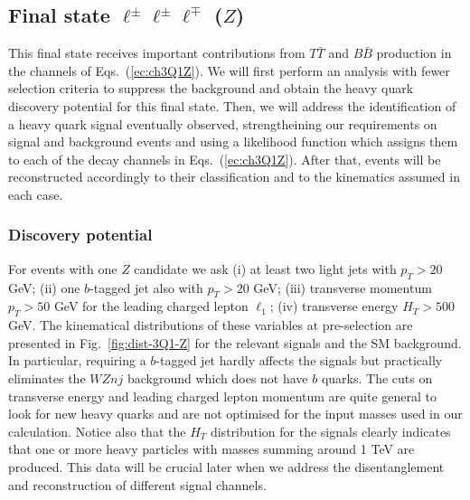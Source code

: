 \documentclass[12pt,a4paper]{article}
\newcommand{\TT}{T \bar T}
\newcommand{\BB}{B \bar B}
\begin{document}
\subsection{Final state $\ell^\pm \ell^\pm \ell^\mp$ ($Z$)}

This final state receives important contributions from $\TT$ and $\BB$ production in the channels of Eqs.~(\ref{ec:ch3Q1Z}). We will first perform an analysis with fewer selection criteria to suppress the background and obtain the heavy quark discovery potential for this final state. Then, we will address the identification of a heavy quark signal eventually observed, strengtheining our requirements on signal and background events and using a likelihood function which assigns them to each of the decay channels in Eqs.~(\ref{ec:ch3Q1Z}). After that,
events will be reconstructed accordingly to their classification and to the kinematics assumed in each case.


\subsubsection{Discovery potential}

For events with one $Z$ candidate we ask (i) at least two light jets with $p_T > 20$ GeV; (ii) one $b$-tagged jet also with $p_T > 20$ GeV; (iii) transverse momentum $p_T > 50$ GeV for the leading charged lepton $\ell_1$; (iv) transverse energy $H_T > 500$ GeV. The kinematical distributions of these variables at pre-selection are presented in Fig.~\ref{fig:dist-3Q1-Z} for the relevant signals and the SM background. 
In particular, requiring a $b$-tagged jet hardly affects the signals but practically eliminates the $WZnj$ background which does not have $b$ quarks. The cuts on transverse energy and leading charged lepton momentum are quite general to look for new heavy quarks and are not optimised for the input masses used in our calculation. Notice also that the $H_T$ distribution for the signals clearly indicates that one or more heavy particles with masses summing around 1 TeV are produced. This data will be crucial later when we address the disentanglement and reconstruction of different signal channels.
\end{document}
